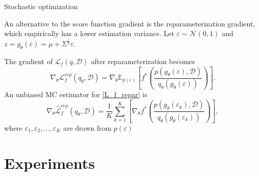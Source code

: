 \documentclass{beamer}
\begin{document}
\begin{frame}{Stochastic optimization}
    \begin{block}{}
        An alternative to the score function gradient is the reparameterization gradient, which empirically has a lower estimation variance. Let $\varepsilon \sim \mathcal{N}(0, 1)$ and $z = g_\theta(\varepsilon) = \mu + \Sigma^{\frac{1}{2}}\varepsilon$.
        
        The gradient of $\mathcal{L}_f(q, \mathcal{D})$ after reparameterization becomes
        \begin{equation}\label{L_f_repar}
            \nabla_{\theta}\mathcal{L}_f^{rep}(q_\theta, \mathcal{D}) = \nabla_{\theta}\mathbb{E}_{p(\varepsilon)}\left[f^{*}\left(\dfrac{p(g_\theta(\varepsilon), \mathcal{D})}{q_\theta(g_\theta(\varepsilon))}\right)\right].
        \end{equation}
        An unbiased MC estimator for \eqref{L_f_repar} is
        \begin{equation}
            \nabla_{\theta}\hat{\mathcal{L}}_f^{rep}(q_\theta, \mathcal{D}) = \dfrac{1}{K}\sum_{k=1}^K\left[\nabla_{\theta}f^{*}\left(\dfrac{p(g_\theta(\varepsilon_k), \mathcal{D})}{q_\theta(g_\theta(\varepsilon_k))}\right)\right],
        \end{equation}
        where $\varepsilon_1, \varepsilon_2, \ldots, \varepsilon_K$ are drawn from $p(\varepsilon)$
    \end{block}
\end{frame}

\section{Experiments}
\end{document}
